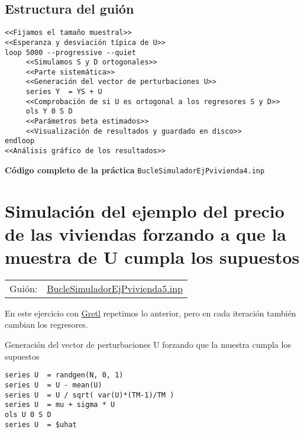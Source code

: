 \documentclass[11pt]{article}
\begin{document}
\subsection{Estructura del guión}
\label{sec:org50228fe}

\begin{verbatim}
<<Fijamos el tamaño muestral>>
<<Esperanza y desviación típica de U>>
loop 5000 --progressive --quiet
     <<Simulamos S y D ortogonales>>
     <<Parte sistemática>>
     <<Generación del vector de perturbaciones U>>
     series Y  = YS + U
     <<Comprobación de si U es ortogonal a los regresores S y D>>
     ols Y 0 S D
     <<Parámetros beta estimados>>
     <<Visualización de resultados y guardado en disco>>
endloop
<<Análisis gráfico de los resultados>>
\end{verbatim}

\clearpage
\noindent
\textbf{Código completo de la práctica} \texttt{BucleSimuladorEjPvivienda4.inp}
\vspace{10pt}

\clearpage


\section{Simulación del ejemplo del precio de las viviendas forzando a que la muestra de U cumpla los supuestos}
\label{sec:org4622744}

\begin{center}
\begin{tabular}{ll}
Guión: & \href{https://github.com/mbujosab/Ectr/tree/master/Practicas/Gretl/scripts/BucleSimuladorEjPvivienda5.inp}{BucleSimuladorEjPvivienda5.inp}\\[0pt]
\end{tabular}
\end{center}

En este ejercicio con \href{https://gretl.sourceforge.net/es.html}{Gretl} repetimos lo anterior, pero en cada
iteración también cambian los regresores.

\begin{description}
\item[{Generación del vector de perturbaciones U forzando que la muestra cumpla los supuestos}] 
\end{description}
\begin{verbatim}
series U  = randgen(N, 0, 1)
series U  = U - mean(U)
series U  = U / sqrt( var(U)*(TM-1)/TM )
series U  = mu + sigma * U
ols U 0 S D
series U  = $uhat
\end{verbatim}
\end{document}
